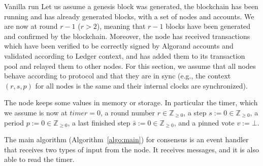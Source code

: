 \documentclass[10pt,a4paper]{article}
\begin{document}
\begin{section}{Vanilla run}\label{subsect:vanilla-run}
    Let us assume a genesis block was generated, the blockchain has been running and
    has already generated blocks, with a set of nodes and accounts. 
    We are now at round $r-1$ ($r>2$), meaning that $r-1$ blocks have been 
    generated and confirmed by the blockchain.
    Moreover, the node has received transactions which have been verified to 
    be correctly signed by Algorand accounts and validated according to Ledger context, 
    and has added them to its transaction pool and relayed them to other nodes.
    For this section, we assume that all nodes behave according to protocol
    and that they are in sync (e.g., the context $(r,s,p)$ for all nodes is 
    the same and their internal clocks are synchronized).
    
    The node keeps some values in memory or storage. In particular the 
    timer, which we assume is now at $timer=0$,
    a round number $r\in\mathbb{Z}_{\ge 0}$, 
    a step $s:=0\in\mathbb{Z}_{\ge 0}$,
    a period $p:=0\in\mathbb{Z}_{\ge 0}$, 
    a last finished step $\bar{s}:=0\in\mathbb{Z}_{\ge 0}$, and 
    a pinned vote $v:=\bot$.
    
    The main algorithm (Algorithm~\ref{algo:main}) for consensus is an event 
    handler that receives two types of input from the node. 
    It receives messages, and it is also able to read the timer.
    
    

\end{section}
\end{document}
